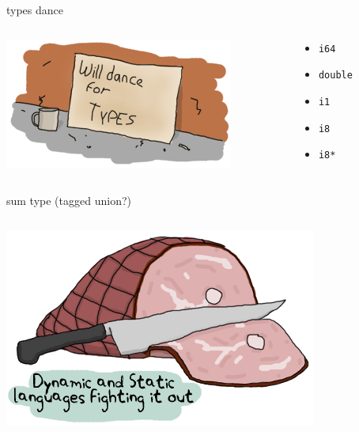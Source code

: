 \documentclass{beamer}
\begin{document}
\begin{frame}{types dance}
  \begin{columns}
    \begin{column}[b]{5.5cm}
      \includegraphics[scale=0.6]{types-dance}
    \end{column}
    \begin{column}[b]{4.5cm}
      \begin{itemize}
      \item[] \texttt{i64}
      \item[] \texttt{double}
      \item[] \texttt{i1}
      \item[] \texttt{i8}
      \item[] \texttt{i8*}
      \end{itemize}
    \end{column}
  \end{columns}
\end{frame}

\begin{frame}{sum type (tagged union?)}
  \begin{columns}
    \begin{column}[b]{5.5cm}
      \includegraphics[scale=0.4]{dynamic-static-types}
    \end{column}
    \begin{column}[b]{4.5cm}
      
    \end{column}
  \end{columns}
\end{frame}
\end{document}
